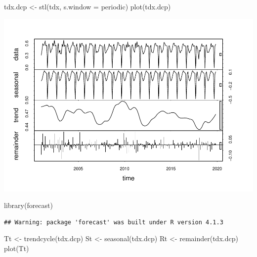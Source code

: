 \documentclass[10pt]{report}
\newenvironment{Shaded}{\begin{snugshade}}{\end{snugshade}}
\newcommand{\AttributeTok}[1]{\textcolor[rgb]{0.77,0.63,0.00}{#1}}
\newcommand{\FunctionTok}[1]{\textcolor[rgb]{0.00,0.00,0.00}{#1}}
\newcommand{\NormalTok}[1]{#1}
\newcommand{\OtherTok}[1]{\textcolor[rgb]{0.56,0.35,0.01}{#1}}
\newcommand{\StringTok}[1]{\textcolor[rgb]{0.31,0.60,0.02}{#1}}
\begin{document}
\begin{Shaded}
\begin{Highlighting}[]
\NormalTok{tdx.dcp }\OtherTok{\textless{}{-}} \FunctionTok{stl}\NormalTok{(tdx, }\AttributeTok{s.window =} \StringTok{\textquotesingle{}periodic\textquotesingle{}}\NormalTok{)}
\FunctionTok{plot}\NormalTok{(tdx.dcp)}
\end{Highlighting}
\end{Shaded}

\includegraphics{unnamed-chunk-15-1.pdf}

\begin{Shaded}
\begin{Highlighting}[]
\FunctionTok{library}\NormalTok{(forecast)}
\end{Highlighting}
\end{Shaded}

\begin{verbatim}
## Warning: package 'forecast' was built under R version 4.1.3
\end{verbatim}

\begin{Shaded}
\begin{Highlighting}[]
\NormalTok{Tt }\OtherTok{\textless{}{-}} \FunctionTok{trendcycle}\NormalTok{(tdx.dcp)}
\NormalTok{St }\OtherTok{\textless{}{-}} \FunctionTok{seasonal}\NormalTok{(tdx.dcp)}
\NormalTok{Rt }\OtherTok{\textless{}{-}} \FunctionTok{remainder}\NormalTok{(tdx.dcp)}
\FunctionTok{plot}\NormalTok{(Tt)}
\end{Highlighting}
\end{Shaded}
\end{document}
